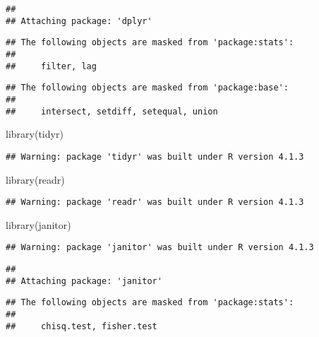 \documentclass[
]{article}
\newenvironment{Shaded}{\begin{snugshade}}{\end{snugshade}}
\newcommand{\FunctionTok}[1]{\textcolor[rgb]{0.00,0.00,0.00}{#1}}
\newcommand{\NormalTok}[1]{#1}
\begin{document}
\begin{verbatim}
## 
## Attaching package: 'dplyr'
\end{verbatim}

\begin{verbatim}
## The following objects are masked from 'package:stats':
## 
##     filter, lag
\end{verbatim}

\begin{verbatim}
## The following objects are masked from 'package:base':
## 
##     intersect, setdiff, setequal, union
\end{verbatim}

\begin{Shaded}
\begin{Highlighting}[]
\FunctionTok{library}\NormalTok{(tidyr)}
\end{Highlighting}
\end{Shaded}

\begin{verbatim}
## Warning: package 'tidyr' was built under R version 4.1.3
\end{verbatim}

\begin{Shaded}
\begin{Highlighting}[]
\FunctionTok{library}\NormalTok{(readr)}
\end{Highlighting}
\end{Shaded}

\begin{verbatim}
## Warning: package 'readr' was built under R version 4.1.3
\end{verbatim}

\begin{Shaded}
\begin{Highlighting}[]
\FunctionTok{library}\NormalTok{(janitor)}
\end{Highlighting}
\end{Shaded}

\begin{verbatim}
## Warning: package 'janitor' was built under R version 4.1.3
\end{verbatim}

\begin{verbatim}
## 
## Attaching package: 'janitor'
\end{verbatim}

\begin{verbatim}
## The following objects are masked from 'package:stats':
## 
##     chisq.test, fisher.test
\end{verbatim}
\end{document}
